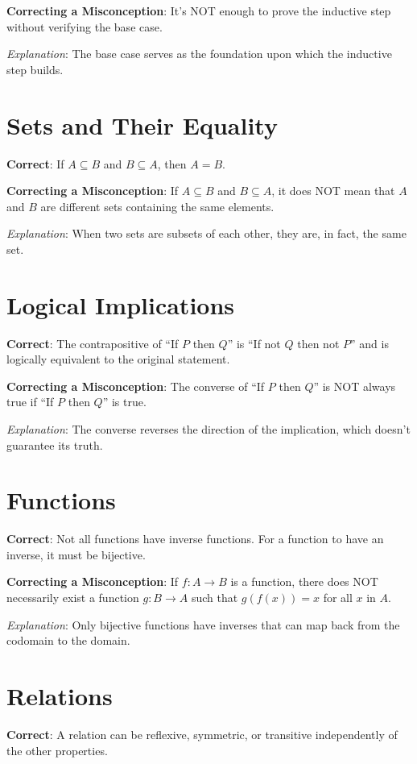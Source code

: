 \documentclass[12pt]{article}
\begin{document}
\textbf{Correcting a Misconception}: It's NOT enough to prove the inductive step without verifying the base case.

\textit{Explanation}: The base case serves as the foundation upon which the inductive step builds.

\section*{Sets and Their Equality}
\textbf{Correct}: If \(A \subseteq B\) and \(B \subseteq A\), then \(A = B\).

\textbf{Correcting a Misconception}: If \(A \subseteq B\) and \(B \subseteq A\), it does NOT mean that \(A\) and \(B\) are different sets containing the same elements.

\textit{Explanation}: When two sets are subsets of each other, they are, in fact, the same set.

\section*{Logical Implications}
\textbf{Correct}: The contrapositive of ``If \(P\) then \(Q\)'' is ``If not \(Q\) then not \(P\)'' and is logically equivalent to the original statement.

\textbf{Correcting a Misconception}: The converse of ``If \(P\) then \(Q\)'' is NOT always true if ``If \(P\) then \(Q\)'' is true.

\textit{Explanation}: The converse reverses the direction of the implication, which doesn't guarantee its truth.

\section*{Functions}
\textbf{Correct}: Not all functions have inverse functions. For a function to have an inverse, it must be bijective.

\textbf{Correcting a Misconception}: If \(f: A \rightarrow B\) is a function, there does NOT necessarily exist a function \(g: B \rightarrow A\) such that \(g(f(x)) = x\) for all \(x\) in \(A\).

\textit{Explanation}: Only bijective functions have inverses that can map back from the codomain to the domain.

\section*{Relations}
\textbf{Correct}: A relation can be reflexive, symmetric, or transitive independently of the other properties.
\end{document}
